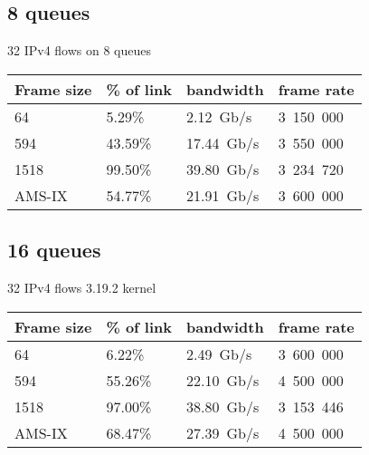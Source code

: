 \subsection{8 queues}
32 IPv4 flows on 8 queues
\begin{tabular}{ | l | l | l | l | }
\hline
Frame size & \% of link & bandwidth & frame rate \\
\hline
64     &  5.29\% &  2.12~Gb/s & 3~150~000 \\ %
594    & 43.59\% & 17.44~Gb/s & 3~550~000 \\ %
1518   & 99.50\% & 39.80~Gb/s & 3~234~720 \\ %
AMS-IX & 54.77\% & 21.91~Gb/s & 3~600~000 \\ %
\hline
\end{tabular}

\subsection{16 queues}
32 IPv4 flows 3.19.2 kernel

\begin{tabular}{ | l | l | l | l | }
\hline
Frame size & \% of link & bandwidth & frame rate \\
\hline
64     &   6.22\% &  2.49~Gb/s & 3~600~000 \\ %
594    &  55.26\% & 22.10~Gb/s & 4~500~000 \\ %
1518   &  97.00\% & 38.80~Gb/s & 3~153~446 \\ %
AMS-IX &  68.47\% & 27.39~Gb/s & 4~500~000 \\ %
\hline
\end{tabular}


